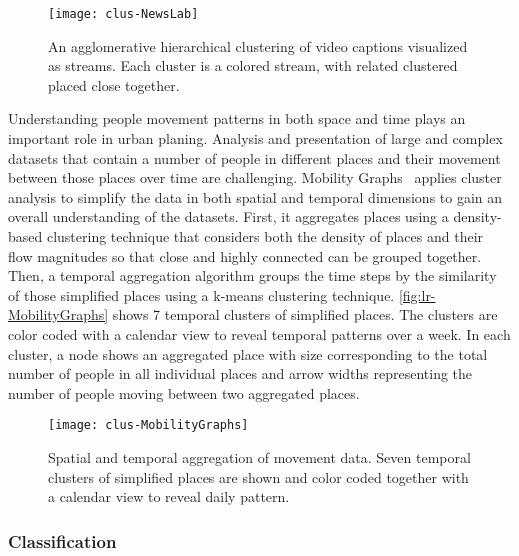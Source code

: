 \begin{figure}[!htb]
	\centering
	\texttt{[image: clus-NewsLab]}
	\caption[An agglomerative hierarchical clustering of video captions]{An agglomerative hierarchical clustering of video captions visualized as streams. Each cluster is a colored stream, with related clustered placed close together. }
	\label{fig:lr-NewsLab}
\end{figure}

Understanding people movement patterns in both space and time plays an important role in urban planing. Analysis and presentation of large and complex datasets that contain a number of people in different places and their movement between those places over time are challenging. Mobility Graphs~\cite{Landesberger2016} applies cluster analysis to simplify the data in both spatial and temporal dimensions to gain an overall understanding of the datasets. First, it aggregates places using a density-based clustering technique that considers both the density of places and their flow magnitudes so that close and highly connected can be grouped together. Then, a temporal aggregation algorithm groups the time steps by the similarity of those simplified places using a k-means clustering technique. \autoref{fig:lr-MobilityGraphs} shows 7 temporal clusters of simplified places. The clusters are color coded with a calendar view to reveal temporal patterns over a week. In each cluster, a node shows an aggregated place with size corresponding to the total number of people in all individual places and arrow widths representing the number of people moving between two aggregated places.

\begin{figure}[!htb]
	\centering
	\texttt{[image: clus-MobilityGraphs]}
	\caption[Spatial and temporal aggregation of movement data]{Spatial and temporal aggregation of movement data. Seven temporal clusters of simplified places are shown and color coded together with a calendar view to reveal daily pattern. }
	\label{fig:lr-MobilityGraphs}
\end{figure}

\subsubsection{Classification}
